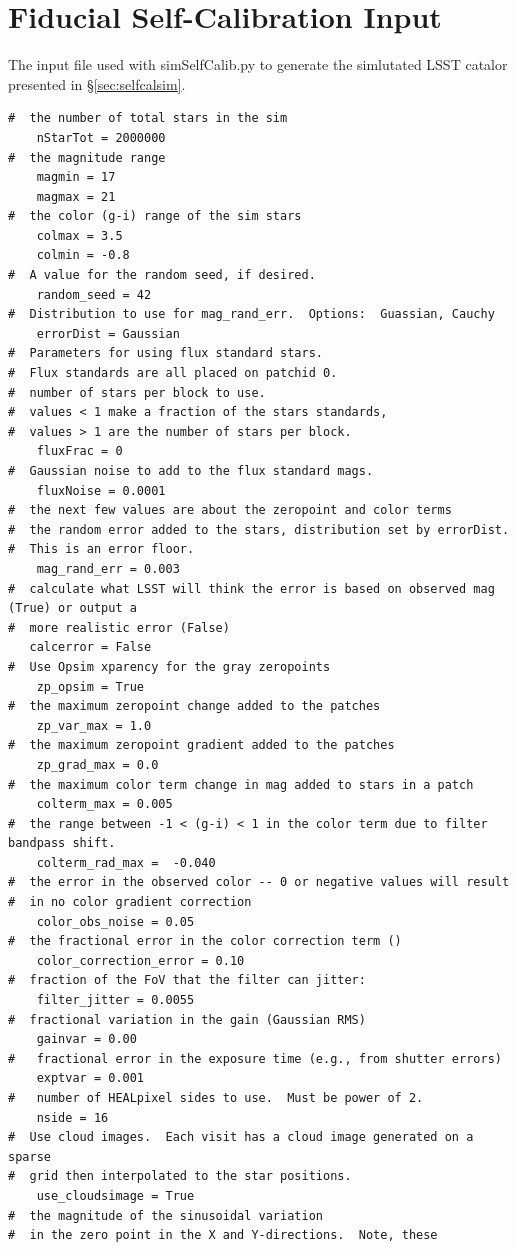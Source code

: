 \documentclass[12pt,preprint]{aastex}
\begin{document}
\section{Fiducial Self-Calibration Input}\label{sec:siminput}
The input file used with simSelfCalib.py to generate the simlutated LSST catalor presented in \S\ref{sec:selfcalsim}.
\begin{verbatim}
#  the number of total stars in the sim
    nStarTot = 2000000
#  the magnitude range  
    magmin = 17
    magmax = 21
#  the color (g-i) range of the sim stars
    colmax = 3.5
    colmin = -0.8
#  A value for the random seed, if desired.
    random_seed = 42
#  Distribution to use for mag_rand_err.  Options:  Guassian, Cauchy
    errorDist = Gaussian
#  Parameters for using flux standard stars.  
#  Flux standards are all placed on patchid 0.
#  number of stars per block to use.  
#  values < 1 make a fraction of the stars standards, 
#  values > 1 are the number of stars per block.
    fluxFrac = 0
#  Gaussian noise to add to the flux standard mags.
    fluxNoise = 0.0001 
#  the next few values are about the zeropoint and color terms
#  the random error added to the stars, distribution set by errorDist.  
#  This is an error floor.
    mag_rand_err = 0.003
#  calculate what LSST will think the error is based on observed mag (True) or output a 
#  more realistic error (False)
   calcerror = False
#  Use Opsim xparency for the gray zeropoints
    zp_opsim = True
#  the maximum zeropoint change added to the patches
    zp_var_max = 1.0
#  the maximum zeropoint gradient added to the patches
    zp_grad_max = 0.0
#  the maximum color term change in mag added to stars in a patch
    colterm_max = 0.005
#  the range between -1 < (g-i) < 1 in the color term due to filter bandpass shift. 
    colterm_rad_max =  -0.040
#  the error in the observed color -- 0 or negative values will result
#  in no color gradient correction
    color_obs_noise = 0.05
#  the fractional error in the color correction term ()
    color_correction_error = 0.10
#  fraction of the FoV that the filter can jitter:   
    filter_jitter = 0.0055
#  fractional variation in the gain (Gaussian RMS)
    gainvar = 0.00
#   fractional error in the exposure time (e.g., from shutter errors)
    exptvar = 0.001
#   number of HEALpixel sides to use.  Must be power of 2.
    nside = 16
#  Use cloud images.  Each visit has a cloud image generated on a sparse 
#  grid then interpolated to the star positions.    
    use_cloudsimage = True
#  the magnitude of the sinusoidal variation 
#  in the zero point in the X and Y-directions.  Note, these 

\end{verbatim}
\end{document}
